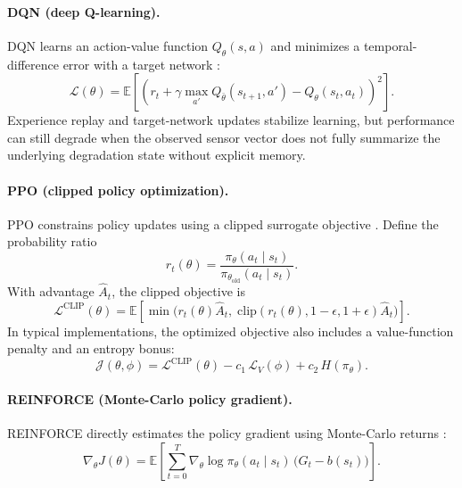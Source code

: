 \documentclass[sn-basic]{sn-jnl} %
\begin{document}
\paragraph{DQN (deep Q-learning).}
DQN learns an action-value function $Q_\theta(s,a)$ and minimizes a temporal-difference error with a target network \cite{Mnih2015}:
\begin{equation}
\mathcal{L}(\theta)=\mathbb{E}\left[\left(r_t + \gamma\max_{a'}Q_{\bar\theta}(s_{t+1},a') - Q_\theta(s_t,a_t)\right)^2\right].
\end{equation}
Experience replay and target-network updates stabilize learning, but performance can still degrade when the observed sensor vector does not fully summarize the underlying degradation state without explicit memory.

\paragraph{PPO (clipped policy optimization).}
PPO constrains policy updates using a clipped surrogate objective \cite{Schulman2017}. Define the probability ratio
\begin{equation}
 r_t(\theta)=\frac{\pi_\theta(a_t\mid s_t)}{\pi_{\theta_{\mathrm{old}}}(a_t\mid s_t)}.
\end{equation}
With advantage $\hat{A}_t$, the clipped objective is
\begin{equation}
\mathcal{L}^{\mathrm{CLIP}}(\theta)=\mathbb{E}\left[\min\Big(r_t(\theta)\hat{A}_t,\;\mathrm{clip}(r_t(\theta),1-\epsilon,1+\epsilon)\hat{A}_t\Big)\right].
\end{equation}
In typical implementations, the optimized objective also includes a value-function penalty and an entropy bonus:
\begin{equation}
\mathcal{J}(\theta,\phi)=\mathcal{L}^{\mathrm{CLIP}}(\theta) - c_1\,\mathcal{L}_V(\phi) + c_2\,H(\pi_\theta).
\end{equation}

\paragraph{REINFORCE (Monte-Carlo policy gradient).}
REINFORCE directly estimates the policy gradient using Monte-Carlo returns \cite{Williams1992}:
\begin{equation}
\nabla_\theta J(\theta) = \mathbb{E}\left[\sum_{t=0}^{T} \nabla_\theta \log \pi_\theta(a_t\mid s_t)\,\big(G_t-b(s_t)\big)\right].
\end{equation}
\end{document}

